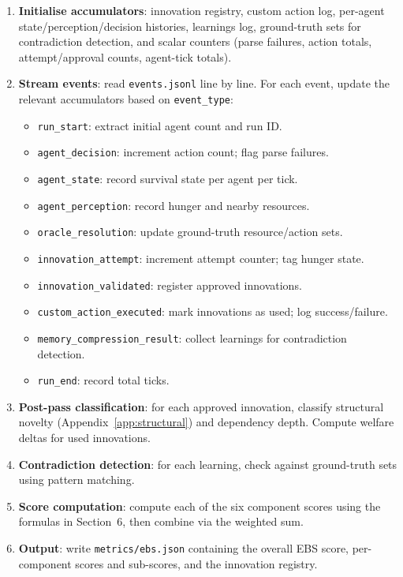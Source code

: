 \documentclass[a4paper, 11pt]{article}
\begin{document}
\begin{enumerate}
    \item \textbf{Initialise accumulators}: innovation registry, custom action log, per-agent state/perception/decision histories, learnings log, ground-truth sets for contradiction detection, and scalar counters (parse failures, action totals, attempt/approval counts, agent-tick totals).

    \item \textbf{Stream events}: read \texttt{events.jsonl} line by line. For each event, update the relevant accumulators based on \texttt{event\_type}:
    \begin{itemize}[nosep]
        \item \texttt{run\_start}: extract initial agent count and run ID.
        \item \texttt{agent\_decision}: increment action count; flag parse failures.
        \item \texttt{agent\_state}: record survival state per agent per tick.
        \item \texttt{agent\_perception}: record hunger and nearby resources.
        \item \texttt{oracle\_resolution}: update ground-truth resource/action sets.
        \item \texttt{innovation\_attempt}: increment attempt counter; tag hunger state.
        \item \texttt{innovation\_validated}: register approved innovations.
        \item \texttt{custom\_action\_executed}: mark innovations as used; log success/failure.
        \item \texttt{memory\_compression\_result}: collect learnings for contradiction detection.
        \item \texttt{run\_end}: record total ticks.
    \end{itemize}

    \item \textbf{Post-pass classification}: for each approved innovation, classify structural novelty (Appendix~\ref{app:structural}) and dependency depth. Compute welfare deltas for used innovations.

    \item \textbf{Contradiction detection}: for each learning, check against ground-truth sets using pattern matching.

    \item \textbf{Score computation}: compute each of the six component scores using the formulas in Section~6, then combine via the weighted sum.

    \item \textbf{Output}: write \texttt{metrics/ebs.json} containing the overall EBS score, per-component scores and sub-scores, and the innovation registry.
\end{enumerate}
\end{document}
